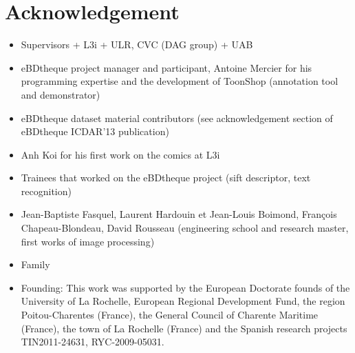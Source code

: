 \chapter*{Acknowledgement}
\begin{itemize}
	\item Supervisors + L3i + ULR, CVC (DAG group) + UAB
	\item eBDtheque project manager and participant, Antoine Mercier for his programming expertise and the development of ToonShop (annotation tool and demonstrator)
	\item eBDtheque dataset material contributors (see acknowledgement section of eBDtheque ICDAR'13 publication)
	\item Anh Koi for his first work on the comics at L3i
	\item Trainees that worked on the eBDtheque project (sift descriptor, text recognition)
	\item Jean-Baptiste Fasquel, Laurent Hardouin et Jean-Louis Boimond, François Chapeau-Blondeau, David Rousseau (engineering school and research master, first works of image processing)
	\item Family
	\item Founding: This work was supported by the European Doctorate founds of the  University of La Rochelle, European Regional Development Fund, the region Poitou-Charentes (France), the General Council of Charente Maritime (France), the town of La Rochelle (France) and the Spanish research projects TIN2011-24631, RYC-2009-05031.
\end{itemize}
\clearpage\thispagestyle{empty}